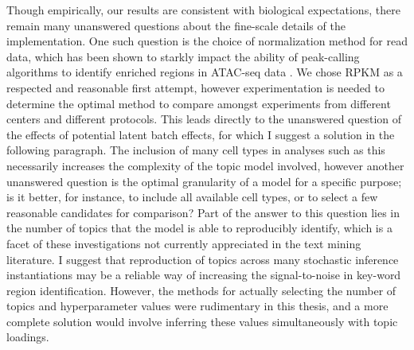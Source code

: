 Though empirically, our results are consistent with biological expectations, there remain many unanswered questions about the fine-scale details of the implementation. One such question is the choice of normalization method for read data, which has been shown to starkly impact the ability of peak-calling algorithms to identify enriched regions in ATAC-seq data \cite{Reske2020a}. We chose RPKM as a respected and reasonable first attempt, however experimentation is needed to determine the optimal method to compare amongst experiments from different centers and different protocols. This leads directly to the unanswered question of the effects of potential latent batch effects, for which I suggest a solution in the following paragraph. The inclusion of many cell types in analyses such as this necessarily increases the complexity of the topic model involved, however another unanswered question is the optimal granularity of a model for a specific purpose; is it better, for instance, to include all available cell types, or to select a few reasonable candidates for comparison? Part of the answer to this question lies in the number of topics that the model is able to reproducibly identify, which is a facet of these investigations not currently appreciated in the text mining literature. I suggest that reproduction of topics across many stochastic inference instantiations may be a reliable way of increasing the signal-to-noise in key-word region identification. However, the methods for actually selecting the number of topics and hyperparameter values were rudimentary in this thesis, and a more complete solution would involve inferring these values simultaneously with topic loadings. 

